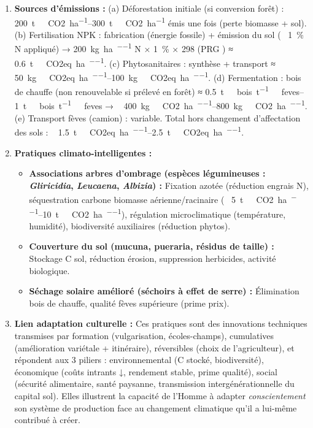 \documentclass[11pt]{article}
\begin{document}
\begin{corrige}
\begin{enumerate}
    \item \textbf{Sources d'émissions :} (a) Déforestation initiale (si conversion forêt) : ~ \SIrange{200}{300}{\tonne\ CO2\per\hectare} émis une fois (perte biomasse + sol). (b) Fertilisation NPK : fabrication (énergie fossile) + émission  du sol (~ \SI{1}{\%} N appliqué) → \SI{200}{\kilo\gram\per\hectare\per\an} N × \SI{1}{\%} × 298 (PRG ) ≈ \SI{0,6}{\tonne\ CO2eq\per\hectare\per\an}. (c) Phytosanitaires : synthèse + transport ≈ \SIrange{50}{100}{\kilo\gram\ CO2eq\per\hectare\per\an}. (d) Fermentation : bois de chauffe (non renouvelable si prélevé en forêt) ≈ \SIrange{0,5}{1}{\tonne\ bois\per\tonne\ feves} → ~ \SIrange{400}{800}{\kilo\gram\ CO2\per\hectare\per\an}. (e) Transport fèves (camion) : variable. Total hors changement d'affectation des sols : ~ \SIrange{1,5}{2,5}{\tonne\ CO2eq\per\hectare\per\an}.
    \item \textbf{Pratiques climato-intelligentes :} 
    \begin{itemize}
        \item \textbf{Associations arbres d'ombrage (espèces légumineuses : \emph{Gliricidia}, \emph{Leucaena}, \emph{Albizia}) :} Fixation azotée (réduction engrais N), séquestration carbone biomasse aérienne/racinaire (~ \SIrange{5}{10}{\tonne\ CO2\per\hectare\per\an}), régulation microclimatique (température, humidité), biodiversité auxiliaires (réduction phytos).
        \item \textbf{Couverture du sol (mucuna, pueraria, résidus de taille) :} Stockage C sol, réduction érosion, suppression herbicides, activité biologique.
        \item \textbf{Séchage solaire amélioré (séchoirs à effet de serre) :} Élimination bois de chauffe, qualité fèves supérieure (prime prix).
    \end{itemize}
    \item \textbf{Lien adaptation culturelle :} Ces pratiques sont des innovations techniques transmises par formation (vulgarisation, écoles-champs), cumulatives (amélioration variétale + itinéraire), réversibles (choix de l'agriculteur), et répondent aux 3 piliers : environnemental (C stocké, biodiversité), économique (coûts intrants ↓, rendement stable, prime qualité), social (sécurité alimentaire, santé paysanne, transmission intergénérationnelle du capital sol). Elles illustrent la capacité de l'Homme à adapter \emph{conscientement} son système de production face au changement climatique qu'il a lui-même contribué à créer.
\end{enumerate}
\end{corrige}
\end{document}
